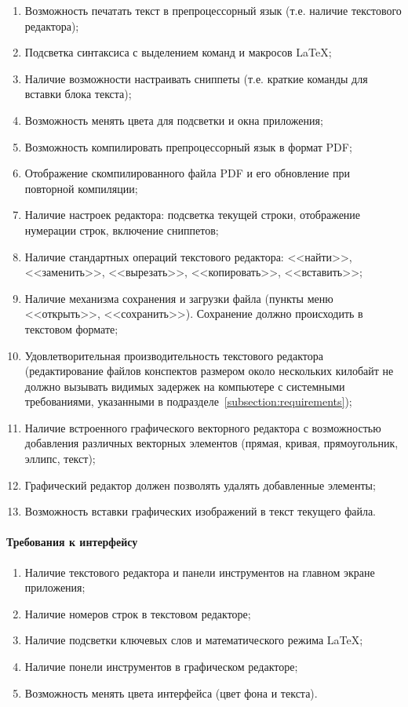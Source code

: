 \documentclass[explnote]{espd}
\begin{document}
\begin{enumerate}
\item Возможность печатать текст в препроцессорный язык (т.е. наличие текстового редактора);
\item Подсветка синтаксиса с выделением команд и макросов LaTeX;
\item Наличие возможности настраивать сниппеты (т.е. краткие команды для вставки блока текста);
\item Возможность менять цвета для подсветки и окна приложения;
\item Возможность компилировать препроцессорный язык в формат PDF;
\item Отображение скомпилированного файла PDF и его обновление при повторной компиляции;
\item Наличие настроек редактора: подсветка текущей строки, отображение нумерации строк, включение сниппетов;
\item Наличие стандартных операций текстового редактора: <<найти>>, <<заменить>>, <<вырезать>>, <<копировать>>, <<вставить>>;
\item Наличие механизма сохранения и загрузки файла (пункты меню <<открыть>>, <<сохранить>>). Сохранение должно происходить в текстовом формате;
\item Удовлетворительная производительность текстового редактора (редактирование файлов конспектов размером около нескольких килобайт не должно вызывать видимых задержек на компьютере с системными требованиями, указанными в подразделе~\ref{subsection:requirements});
\item Наличие встроенного графического векторного редактора с возможностью добавления различных векторных элементов (прямая, кривая, прямоугольник, эллипс, текст);
\item Графический редактор должен позволять удалять добавленные элементы;
\item Возможность вставки графических изображений в текст текущего файла.
\end{enumerate}

\paragraph{Требования к интерфейсу}

\begin{enumerate}
\item Наличие текстового редактора и панели инструментов на главном экране приложения;
\item Наличие номеров строк в текстовом редакторе;
\item Наличие подсветки ключевых слов и математического режима LaTeX;
\item Наличие понели инструментов в графическом редакторе;
\item Возможность менять цвета интерфейса (цвет фона и текста).
\end{enumerate}
\end{document}
